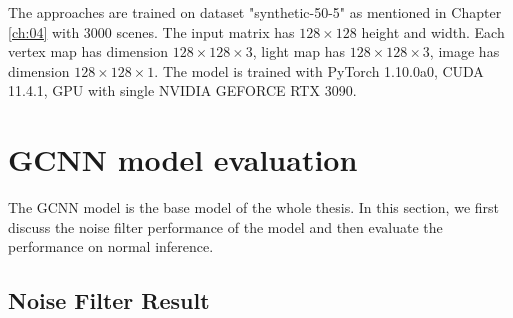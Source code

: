 \documentclass[border=15pt, multi, tikz]{article}
\begin{document}
	
The approaches are trained on dataset "synthetic-50-5" as mentioned in Chapter \ref{ch:04} with 3000 scenes. The input matrix has $ 128\times 128 $ height and width. Each vertex map has dimension $ 128\times 128\times3 $, light map has $ 128\times 128 \times 3 $, image has dimension $ 128\times 128 \times 1 $. The model is trained with PyTorch 1.10.0a0, CUDA 11.4.1, GPU with single NVIDIA GEFORCE RTX 3090.


\section{GCNN model evaluation}
The GCNN model is the base model of the whole thesis. In this section, we first discuss the noise filter performance of the model and then evaluate the performance on normal inference.

\subsection{Noise Filter Result}
\end{document}
